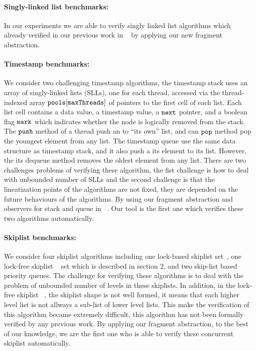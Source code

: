 \paragraph{Singly-linked list benchmarks:} In our experiments we are able to verify singly linked list algorithms which already verified in our previous work in ~\cite{Quy:sas16} by applying our new fragment abstraction.
\paragraph{Timestamp benchmarks:} We consider two challenging timestamp algorithms, the timestamp stack uses an array of singly-linked lists (SLLs), one for each thread, accessed via the thread-indexed array ${\tt pools[maxThreads]}$ of pointers to the first cell of each list. Each list cell contains a data value, a timestamp value, a ${\tt next}$ pointer, and a boolean flag ${\tt mark}$ which indicates whether the node is logically removed from the stack. The $\tt push$ method of a thread push an to ``its own'' list, and can $\tt pop$ method pop the youngest element from any list. The timestamp queue use the same data structure as timestamp stack, and it also push a its element to its list. However, the its dequeue method removes the oldest element from any list. There are two challenges problems of verifying these algorithm, the fist challenge is how to deal with unbounded number of SLLs and the second challenge is that the lineatization points of the algorithms are not fixed, they are depended on the future behaviours of the algorithms. By using our fragment abstraction and observers for stack and queue in ~\cite{BEEH:icalp15}. Our tool is the first one which verifies these two algorithms automatically.

\paragraph{Skiplist benchmarks:} We consider four skiplist algorithms including one lock-based skiplist set~\cite{MS:QueueAlgorithms}, one lock-free skiplist ~\cite{ArtOfMpP} set which is described in section 2, and two skip-list based priority queues. The challenge for verifying these algorithms is to deal with the problem of unbounded number of levels in these skiplists. In addition, in the lock-free skiplist ~\cite{ArtOfMpP}, the skiplist shape is not well formed, it means that each higher level list is not allways a sub-list of lower level lists. This make the verification of this algorithm became extremely difficult, this algorithm has not been formally verified by any previous work. By applying our fragment abstraction,  to the best of our knowledge, we are the first one who is able to verify these concurrent skiplist automatically. 


